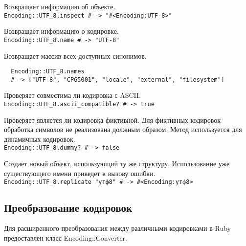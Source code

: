 \begin{methodlist}
  Возвращает информацию об объекте. 
  \\\verb!Encoding::UTF_8.inspect # -> "#<Encoding:UTF-8>"!
 
  Возвращает информацию о кодировке. 
  \\\verb!Encoding::UTF_8.name # -> "UTF-8"!
 
  Возвращает массив всех доступных синонимов.
  \begin{verbatim}
  Encoding::UTF_8.names 
  # -> ["UTF-8", "CP65001", "locale", "external", "filesystem"]
  \end{verbatim}  
 
  Проверяет совместима ли кодировка с ASCII. 
  \\\verb!Encoding::UTF_8.ascii_compatible? # -> true!
 
  Проверяет является ли кодировка фиктивной. Для фиктивных кодировок обработка символов не реализована должным образом. Метод используется для динамичных кодировок. 
  \\\verb!Encoding::UTF_8.dummy? # -> false!

  Создает новый объект, использующий ту же структуру. Использование уже существующего имени приведет к вызову ошибки.
  \\\verb!Encoding::UTF_8.replicate "утф8" # -> #<Encoding:утф8>!
\end{methodlist}

\subsection{Преобразование кодировок}

Для расширенного преобразования между различными кодировками в Ruby предоставлен класс Encoding::Converter.

